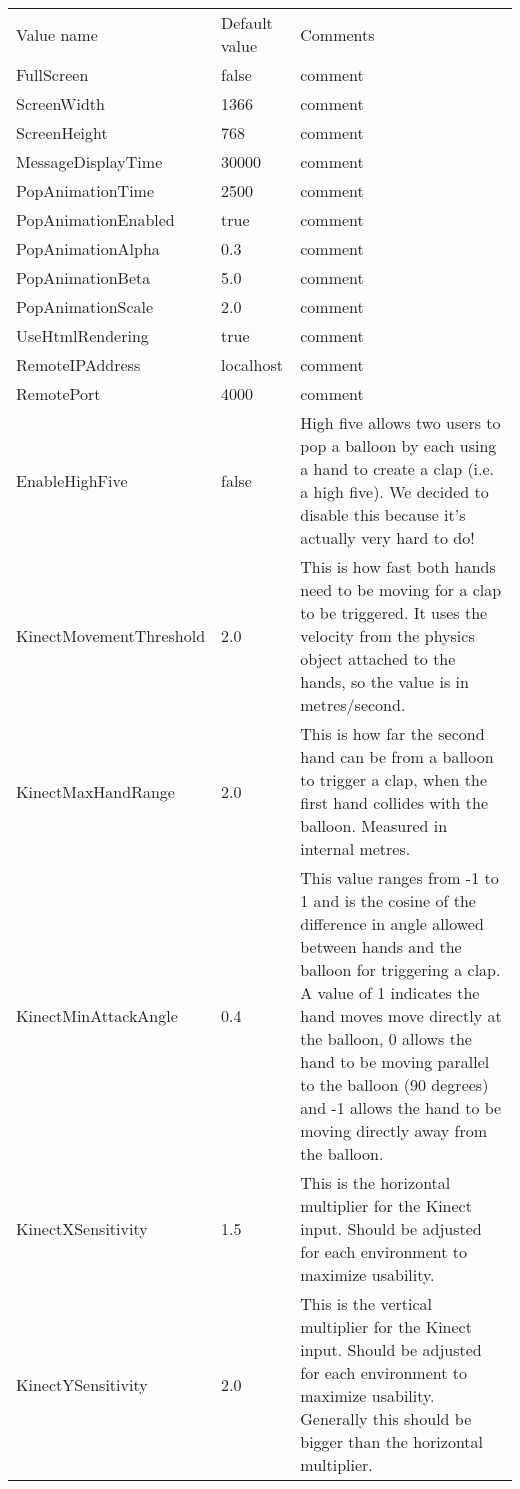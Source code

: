 \begin{tabular}{|>{\raggedright}p{5cm}|>{\raggedright}p{3.6cm}|>{\raggedright}p{7cm}|}

\hline
\multicolumn{3}{|c|}{Client specific values}\tabularnewline
\hline

Value name & Default value & Comments \tabularnewline
\hline

FullScreen & false & comment
\tabularnewline\hline

ScreenWidth & 1366 & comment
\tabularnewline\hline

ScreenHeight & 768 & comment
\tabularnewline\hline

MessageDisplayTime & 30000 & comment
\tabularnewline\hline

PopAnimationTime & 2500 & comment
\tabularnewline\hline

PopAnimationEnabled & true & comment
\tabularnewline\hline

PopAnimationAlpha & 0.3 & comment
\tabularnewline\hline

PopAnimationBeta & 5.0 & comment
\tabularnewline\hline

PopAnimationScale & 2.0 & comment
\tabularnewline\hline

UseHtmlRendering & true & comment
\tabularnewline\hline

RemoteIPAddress & localhost & comment
\tabularnewline\hline

RemotePort & 4000 & comment
\tabularnewline\hline

EnableHighFive & false & High five allows two users to pop a balloon by each using a hand to create a clap (i.e. a high five). We decided to disable this because it's actually very hard to do!
\tabularnewline\hline

KinectMovementThreshold & 2.0 & This is how fast both hands need to be moving for a clap to be triggered. It uses the velocity from the physics object attached to the hands, so the value is in metres/second.
\tabularnewline\hline

KinectMaxHandRange & 2.0 & This is how far the second hand can be from a balloon to trigger a clap, when the first hand collides with the balloon. Measured in internal metres.
\tabularnewline\hline

KinectMinAttackAngle & 0.4 & This value ranges from -1 to 1 and is the cosine of the difference in angle allowed between hands and the balloon for triggering a clap. A value of 1 indicates the hand moves move directly at the balloon, 0 allows the hand to be moving parallel to the balloon (90 degrees) and -1 allows the hand to be moving directly away from the balloon.
\tabularnewline\hline

KinectXSensitivity & 1.5 & This is the horizontal multiplier for the Kinect input. Should be adjusted for each environment to maximize usability.
\tabularnewline\hline

KinectYSensitivity & 2.0 & This is the vertical multiplier for the Kinect input. Should be adjusted for each environment to maximize usability. Generally this should be bigger than the horizontal multiplier.
\tabularnewline\hline


\end{tabular}
